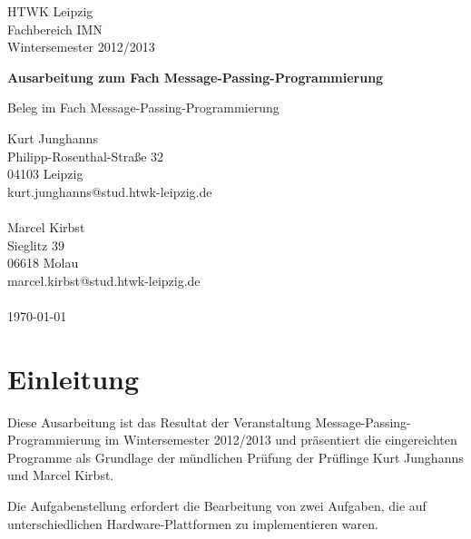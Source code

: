 \documentclass[a4paper,12pt]{scrartcl}
\begin{document}
\begin{titlepage}
\begin{small}
\vfill {HTWK Leipzig\\ 
Fachbereich IMN \\ 
Wintersemester 2012/2013}
\end{small}


\begin{center}
\begin{Large}
\vfill {\textsf{\textbf{
Ausarbeitung zum Fach Message-Passing-Programmierung
}}}

\end{Large}
Beleg im Fach Message-Passing-Programmierung
\end{center}

\begin{small}
\vfill
Kurt Junghanns\\Philipp-Rosenthal-Stra\ss{}e 32\\04103 Leipzig\\kurt.junghanns@stud.htwk-leipzig.de\\
\\Marcel Kirbst\\Sieglitz 39\\06618 Molau\\marcel.kirbst@stud.htwk-leipzig.de\\ \\
\today
\end{small}

\end{titlepage}

\tableofcontents
\thispagestyle{empty}

\clearpage

\onehalfspacing

\pagestyle{plain}


\section{Einleitung}
Diese Ausarbeitung ist das Resultat der Veranstaltung Message-Passing-Programmierung im Wintersemester 2012/2013 und pr\"asentiert die eingereichten Programme
als Grundlage der m\"undlichen Pr\"ufung der Pr\"uflinge Kurt Junghanns und Marcel Kirbst.

Die Aufgabenstellung erfordert die Bearbeitung von zwei Aufgaben, die auf unterschiedlichen Hardware-Plattformen zu implementieren waren.
\end{document}
